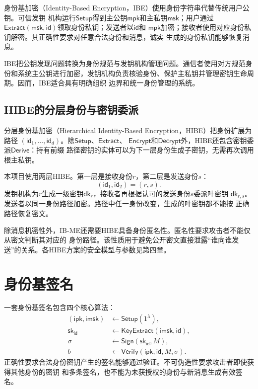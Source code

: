 身份基加密（Identity-Based Encryption，IBE）使用身份字符串代替传统用户公钥。可信发钥
机构运行$\mathsf{Setup}$得到主公钥$\mathsf{mpk}$和主私钥$\mathsf{msk}$；用户通过
$\mathsf{Extract}(\mathsf{msk},\mathsf{id})$领取身份私钥；发送者以$\mathsf{id}$和
$\mathsf{mpk}$加密；接收者使用对应身份私钥解密。其正确性要求对任意合法身份和消息，诚实
生成的身份私钥能够恢复消息。

IBE把公钥发现问题转换为身份规范与发钥机构管理问题。通信者使用对方规范身份和系统主公钥进行加密，发钥机构负责核验身份、保护主私钥并管理密钥生命周期。因而，IBE适合具有明确组织
边界和统一身份管理的系统。

\subsection{HIBE的分层身份与密钥委派}

分层身份基加密（Hierarchical Identity-Based Encryption，HIBE）把身份扩展为路径
$(\mathsf{id}_1,\ldots,\mathsf{id}_d)$。除$\mathsf{Setup}$、$\mathsf{Extract}$、
$\mathsf{Encrypt}$和$\mathsf{Decrypt}$外，HIBE还包含密钥委派$\mathsf{Derive}$：持有前缀
路径密钥的实体可以为下一层身份生成子密钥，无需再次调用根主私钥。

本项目使用两层HIBE。第一层是接收身份$r$，第二层是发送身份$s$：
\[
  (\mathsf{id}_1,\mathsf{id}_2)=(r,s).
\]
发钥机构为$r$生成一级密钥$\mathsf{dk}_r$，接收者再根据认可的发送身份$s$委派叶密钥
$\mathsf{dk}_{r,s}$。发送者以同一身份路径加密。路径中任一身份改变，生成的叶密钥都不能按
正确路径恢复密文。

除消息机密性外，IB-ME还需要HIBE具备身份匿名性。匿名性要求攻击者不能仅从密文判断其对应的
身份路径。该性质用于避免公开密文直接泄露“谁向谁发送”的关系。各HIBE方案的安全模型与参数见第四章。

\section{身份基签名}

一套身份基签名包含四个核心算法：
\[
\begin{aligned}
 (\mathsf{ipk},\mathsf{imsk})&\leftarrow\mathsf{Setup}(1^\lambda),\\
 \mathsf{sk}_{\mathsf{id}}&\leftarrow\mathsf{KeyExtract}(\mathsf{imsk},\mathsf{id}),\\
 \sigma&\leftarrow\mathsf{Sign}(\mathsf{sk}_{\mathsf{id}},M),\\
 b&\leftarrow\mathsf{Verify}(\mathsf{ipk},\mathsf{id},M,\sigma).
\end{aligned}
\]
正确性要求合法身份密钥产生的签名能够通过验证。不可伪造性要求攻击者即使获得其他身份的密钥
和多条签名，也不能为未获授权的身份与新消息生成有效签名。

